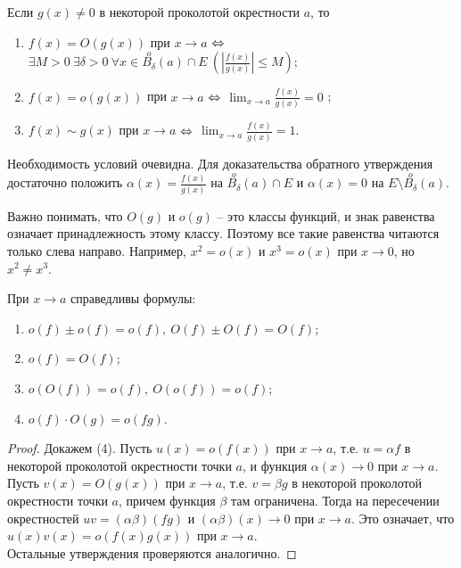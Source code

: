     \begin{note}
        Если $g(x) \neq 0$ в некоторой проколотой окрестности $a$, то 
        \begin{enumerate}
            \item $f(x) = O(g(x))$ при $x \to a$ $\Leftrightarrow$ $\exists M > 0 \ \exists \delta > 0 \ \forall x \in \overset{o}{B_{\delta}}(a) \cap E \ (|\frac{f(x)}{g(x)}| \leq M)$;
            \item $f(x) = o(g(x))$ при $x \to a$ $\Leftrightarrow$ $\lim_{x \to a}\frac{f(x)}{g(x)} = 0$ ;
            \item $f(x) \sim g(x)$ при $x \to a$ $\Leftrightarrow$ $\lim_{x \to a}\frac{f(x)}{g(x)} = 1$. 
        \end{enumerate}
        Необходимость условий очевидна. Для доказательства обратного утверждения достаточно положить $\alpha(x) = \frac{f(x)}{g(x)}$ на $\overset{o}{B_{\delta}}(a) \cap E$ и $\alpha(x) = 0$ на $E \setminus \overset{o}{B_{\delta}}(a)$.
    \end{note}

    \begin{note}
        Важно понимать, что $O(g)$ и $o(g)$ -- это классы функций, и знак равенства означает принадлежность этому классу. Поэтому все такие равенства читаются только слева направо. Например, $x^{2} = o(x)$ и $x^{3} = o(x)$ при $x \to 0$, но $x^{2} \neq x^{3}$.
    \end{note}

    \begin{lemma}
        При $x \to a$ справедливы формулы:
        \begin{enumerate}
            \item $o(f) \pm o(f) = o(f), \ O(f) \pm O(f) = O(f)$;
            \item $o(f) = O(f)$;
            \item $o(O(f)) = o(f), \ O(o(f)) = o(f)$;
            \item $o(f)\cdot O(g) = o(fg)$.
        \end{enumerate}
    \end{lemma}

    \begin{proof}
        Докажем (4). Пусть $u(x) = o(f(x))$ при $x \to a$, т.е. $u = \alpha f$ в некоторой проколотой окрестности точки $a$, и функция $\alpha(x) \to 0$ при $x \to a$. Пусть $v(x) = O(g(x))$ при $x \to a$, т.е. $v = \beta g$ в некоторой проколотой окрестности точки $a$, причем функция $\beta$ там ограничена. Тогда на пересечении окрестностей $uv = (\alpha \beta)(fg)$ и $(\alpha \beta)(x) \to 0$ при $x \to a$. Это означает, что $u(x)v(x) = o(f(x)g(x))$ при $x \to a$.\\
        Остальные утверждения проверяются аналогично.
    \end{proof}

